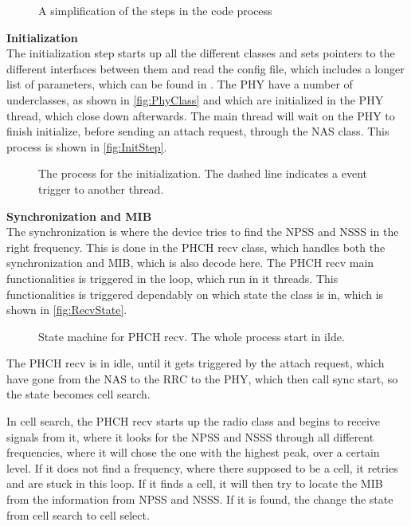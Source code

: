 \begin{figure}[H]
\centering
{}
\resizebox{0.5\textwidth}{!}{
}
\caption{A simplification of the steps in the code process}
\label{fig:MassStep}
\end{figure}

\textbf{Initialization} \\
The initialization step starts up all the different classes and sets pointers to the different interfaces between them and read the config file, which includes a longer list of parameters, which can be found in . The PHY have a number of underclasses, as shown in \autoref{fig:PhyClass} and which are initialized in the PHY thread, which close down afterwards. The main thread will wait on the PHY to finish initialize, before sending an attach request, through the NAS class. This process is shown in \autoref{fig:InitStep}.

\begin{figure}[H]
\centering
{}
\resizebox{0.5\textwidth}{!}{
}
\caption{The process for the initialization. The dashed line indicates a event trigger to another thread.}
\label{fig:InitStep}
\end{figure}


\textbf{Synchronization and MIB} \\
The synchronization is where the device tries to find the NPSS and NSSS in the right frequency. This is done in the PHCH recv class, which handles both the synchronization and MIB, which is also decode here. The PHCH recv main functionalities is triggered in the loop, which run in it threads. This functionalities is triggered dependably on which state the class is in, which is shown in \autoref{fig:RecvState}.

\begin{figure}[H]
\centering
{}
\resizebox{0.5\textwidth}{!}{
}
\caption{State machine for PHCH recv. The whole process start in ilde.}
\label{fig:RecvState}
\end{figure}


The PHCH recv is in idle, until it gets triggered by the attach request, which have gone from the NAS to the RRC to the PHY, which then call sync start, so the state becomes cell search.

In cell search, the PHCH recv starts up the radio class and begins to receive signals from it, where it looks for the NPSS and NSSS through all different frequencies, where it will chose the one with the highest peak, over a certain level. If it does not find a frequency, where there supposed to be a cell, it retries and are stuck in this loop. If it finds a cell, it will then try to locate the MIB from the information from NPSS and NSSS. If it is found, the change the state from cell search to cell select.

